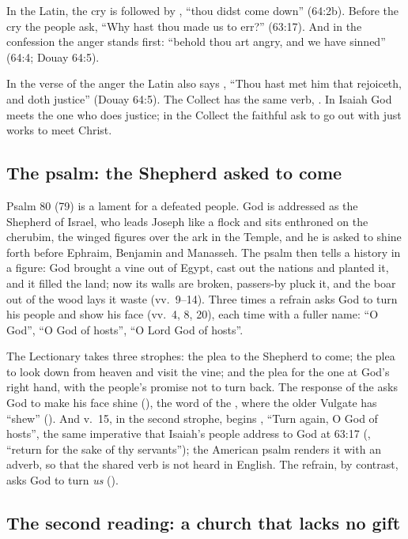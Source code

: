 In the Latin, the cry  is
followed by , ``thou didst come down'' (64:2b). Before the
cry the people ask,
``Why hast thou made us to err?'' (63:17). And in the confession the anger
stands first: ``behold thou art angry, and we have sinned'' (64:4; Douay
64:5).

In the verse of the anger the Latin also says , ``Thou hast met him that rejoiceth, and doth justice'' (Douay
64:5). The Collect has the same verb, . In Isaiah God
meets the one who does justice; in the Collect the faithful ask to go out with
just works to meet Christ.

\subsection{The psalm: the Shepherd asked to come}

Psalm 80 (79) is a lament for a defeated people. God is addressed as the
Shepherd of Israel, who leads Joseph like a flock and sits enthroned on the
cherubim, the winged figures over the ark in the Temple, and he is asked to
shine forth before Ephraim, Benjamin and Manasseh.
The psalm then tells a history in a figure: God brought a vine out of Egypt,
cast out the nations and planted it, and it filled the land; now its walls are
broken, passers-by pluck it, and the boar out of the wood lays it waste
(vv.~9--14). Three times a refrain asks God to turn his people and show his
face (vv.~4, 8, 20), each time with a fuller name: ``O God'', ``O God of
hosts'', ``O Lord God of hosts''.

The Lectionary takes three strophes: the plea to the Shepherd to come; the
plea to look down from heaven and visit the vine; and the plea for the one at
God's right hand, with the people's promise not to turn back. The response of the  asks God to make his
face shine (), the word of the , where the
older Vulgate has ``shew'' (). And v.~15, in the second strophe,
begins , ``Turn again, O God of hosts'', the
same imperative that Isaiah's people address to God at 63:17
(, ``return for the sake of thy
servants''); the American psalm renders it with an adverb, so that the shared
verb is not heard in English. The refrain, by contrast, asks God to turn
\emph{us} ().

\subsection{The second reading: a church that lacks no gift}

